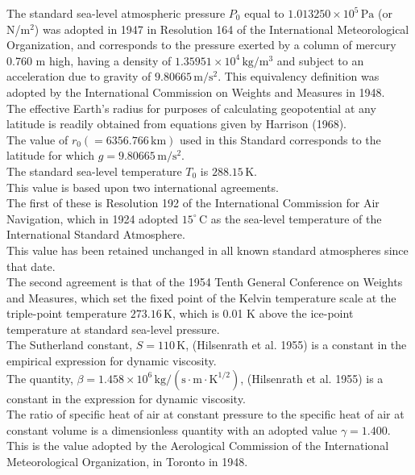 \documentclass{article}
\begin{document}
The standard sea-level atmospheric pressure \(P_0\) equal to \(1.013250 \times 10^{5} \, \mathrm{Pa}\) (or N/m\(^2\)) was adopted in 1947 in Resolution 164 of the International Meteorological Organization, and corresponds to the pressure exerted by a column of mercury 0.760 m high, having a density of \(1.35951 \times 10^{4} \, \mathrm{kg/m^3}\) and subject to an acceleration due to gravity of \(9.80665 \, \mathrm{m/s^2}\).
This equivalency definition was adopted by the International Commission on Weights and Measures in 1948.\\

The effective Earth's radius for purposes of calculating geopotential at any latitude is readily obtained from equations given by Harrison (1968).\\

The value of \(r_0 (= 6356.766 \, \mathrm{km})\) used in this Standard corresponds to the latitude for which \(g = 9.80665 \, \mathrm{m/s^2}\).\\

The standard sea-level temperature \(T_0\) is \(288.15 \, \mathrm{K}\).\\
This value is based upon two international agreements.\\
The first of these is Resolution 192 of the International Commission for Air Navigation, which in 1924 adopted \(15^\circ \, \mathrm{C}\) as the sea-level temperature of the International Standard Atmosphere.\\
This value has been retained unchanged in all known standard atmospheres since that date.\\
The second agreement is that of the 1954 Tenth General Conference on Weights and Measures, which set the fixed point of the Kelvin temperature scale at the triple-point temperature \(273.16 \, \mathrm{K}\), which is 0.01 K above the ice-point temperature at standard sea-level pressure.\\

The Sutherland constant, \(S = 110 \, \mathrm{K}\), (Hilsenrath et al. 1955) is a constant in the empirical expression for dynamic viscosity.\\

The quantity, \(\beta = 1.458 \times 10^{6} \, \mathrm{kg/(s \cdot m \cdot K^{1/2})}\), (Hilsenrath et al. 1955) is a constant in the expression for dynamic viscosity.\\

The ratio of specific heat of air at constant pressure to the specific heat of air at constant volume is a dimensionless quantity with an adopted value \(\gamma = 1.400\).\\
This is the value adopted by the Aerological Commission of the International Meteorological Organization, in Toronto in 1948.\\
\end{document}
